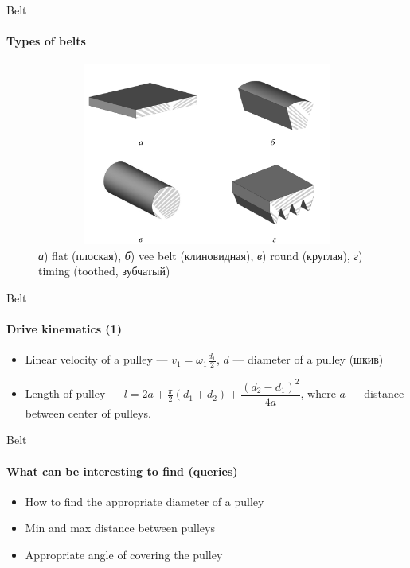 \documentclass[aspectratio=169]{beamer}
\begin{document}
\begin{frame}[t]{Belt}
    \framesubtitle{Types of belts}
    \vspace{-1.2cm}
    \begin{figure}[H]
        \centering\includegraphics[height=6cm,width=1\textwidth,keepaspectratio]{belt_types.png}
        \caption*{\textit{а}) flat (плоская), \textit{б}) vee belt (клиновидная), \textit{в}) round (круглая), \textit{г}) timing (toothed, зубчатый)}
        \label{fig:belt_types.png}
    \end{figure}

\end{frame}

\begin{frame}[t]{Belt}
    \framesubtitle{Drive kinematics (1)}
    \begin{itemize}
        \item Linear velocity of a pulley --- $v_1=\omega_1 \frac{d_1}{2}$, $d$ --- diameter of a pulley (шкив)
        \item Length of pulley --- $l = 2a + \frac{\pi}{2}(d_1 + d_2) + \dfrac{(d_2-d_1)^2}{4a}$, where $a$ --- distance between center of pulleys.
    \end{itemize}
\end{frame}


\begin{frame}[t]{Belt}
    \framesubtitle{What can be interesting to find (queries)}
    \begin{itemize}
        \item How to find the appropriate diameter of a pulley
        \item Min and max distance between pulleys
        \item Appropriate angle of covering the pulley
    \end{itemize}
\end{frame}
\end{document}
